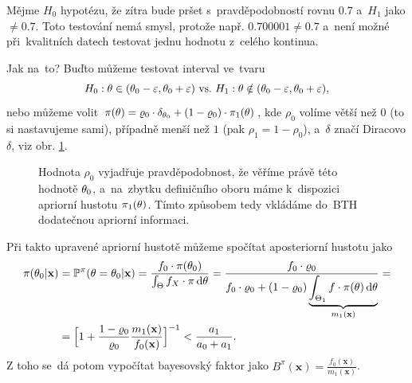 \begin{example}
	Mějme $H_0$ hypotézu, že zítra bude pršet s~pravděpodobností rovnu $0.7$ a~$H_1$ jako $\neq 0.7$. Toto testování nemá smysl, protože např. $0.700001\neq 0.7$ a~není možné při~kvalitních datech testovat jednu hodnotu z~celého kontinua.
	
	Jak na~to? Buďto můžeme testovat interval ve~tvaru $$H_0: \theta\in(\theta_0-\varepsilon,\theta_0+\varepsilon) ~\text{vs.}~ H_1: \theta\notin(\theta_0-\varepsilon,\theta_0+\varepsilon),$$
	nebo můžeme volit $\pi(\theta)=\varrho_0\cdot \delta_{\theta_0}+(1-\varrho_0)\cdot\pi_1(\theta)$, kde $\rho_0$ volíme větší než $0$ (to si nastavujeme sami), případně menší než $1$ (pak $\rho_1=1-\rho_0$), a~$\delta$ značí Diracovo $\delta$, viz obr. \ref{fig:last1}.
	
	\begin{figure}[h]
		\centering
		
		\caption{Hodnota $\rho_0$ vyjadřuje pravděpodobnost, že věříme právě této hodnotě $\theta_0$, a~na~zbytku definičního oboru máme k~dispozici apriorní hustotu $\pi_1(\theta)$. Tímto způsobem tedy vkládáme do~BTH dodatečnou apriorní informaci.}
		\label{fig:last1}
	\end{figure}
	Při takto upravené apriorní hustotě můžeme spočítat aposteriorní hustotu jako
	\begin{align*}
	\pi(\theta_0|\textbf{x})&=\mathbb{P}^\pi(\theta=\theta_0|\textbf{x})=\frac{f_0\cdot\pi(\theta_0)}{\int_\Theta f_X \cdot \pi\,\mathrm{d}\theta}=\frac{f_0\cdot\varrho_0}{f_0\cdot\varrho_0+(1-\varrho_0)\underbrace{\int_{\Theta_1}f\cdot\pi(\theta)\,\mathrm{d}\theta}_{m_1(\textbf{x})}}= \\ 
	&=\Big[1+\frac{1-\varrho_0}{\varrho_0}\frac{m_1(\textbf{x})}{f_0(\textbf{x})}\Big]^{-1}<\frac{a_1}{a_0+a_1}.
	\end{align*}
	Z toho se~dá potom vypočítat bayesovský faktor jako $B^\pi(\textbf{x})=\frac{f_0(\textbf{x})}{m_1(\textbf{x})}$.
\end{example}
